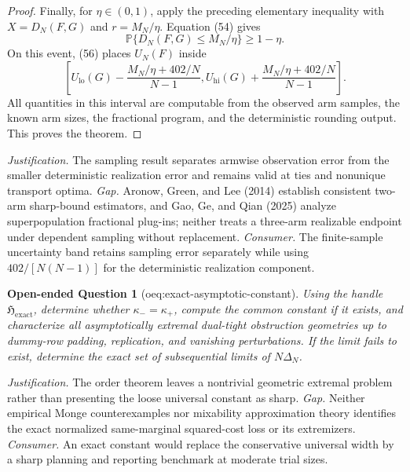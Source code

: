 \documentclass{article}
\newtheorem{openendedquestion}{Open-ended Question}
\begin{document}
\begin{proof}
Finally, for \(\eta\in(0,1)\), apply the preceding elementary inequality with \(X=D_N(F,G)\) and \(r=M_N/\eta\).  Equation (54) gives
\[
 \mathbb P\{D_N(F,G)\le M_N/\eta\}\ge1-\eta. \tag{57}
\]
On this event, (56) places \(U_N(F)\) inside
\[
 \left[
 U_{\mathrm{lo}}(G)-\frac{M_N/\eta+402/N}{N-1},
 U_{\mathrm{hi}}(G)+\frac{M_N/\eta+402/N}{N-1}
 \right].
\]
All quantities in this interval are computable from the observed arm samples, the known arm sizes, the fractional program, and the deterministic rounding output.  This proves the theorem.
\end{proof}
\par\smallskip\noindent \textit{Justification.} The sampling result separates armwise observation error from the smaller deterministic realization error and remains valid at ties and nonunique transport optima. \textit{Gap.} Aronow, Green, and Lee (2014) establish consistent two-arm sharp-bound estimators, and Gao, Ge, and Qian (2025) analyze superpopulation fractional plug-ins; neither treats a three-arm realizable endpoint under dependent sampling without replacement. \textit{Consumer.} The finite-sample uncertainty band retains sampling error separately while using \(402/[N(N-1)]\) for the deterministic realization component.

\begin{openendedquestion}[oeq:exact-asymptotic-constant]\label{oeq:exact-asymptotic-constant}
Using the handle \(\mathfrak H_{\mathrm{exact}}\), determine whether \(\kappa_-=\kappa_+\), compute the common constant if it exists, and characterize all asymptotically extremal dual-tight obstruction geometries up to dummy-row padding, replication, and vanishing perturbations. If the limit fails to exist, determine the exact set of subsequential limits of \(N\Delta_N\).
\end{openendedquestion}
\par\smallskip\noindent \textit{Justification.} The order theorem leaves a nontrivial geometric extremal problem rather than presenting the loose universal constant as sharp. \textit{Gap.} Neither empirical Monge counterexamples nor mixability approximation theory identifies the exact normalized same-marginal squared-cost loss or its extremizers. \textit{Consumer.} An exact constant would replace the conservative universal width by a sharp planning and reporting benchmark at moderate trial sizes.
\end{document}

